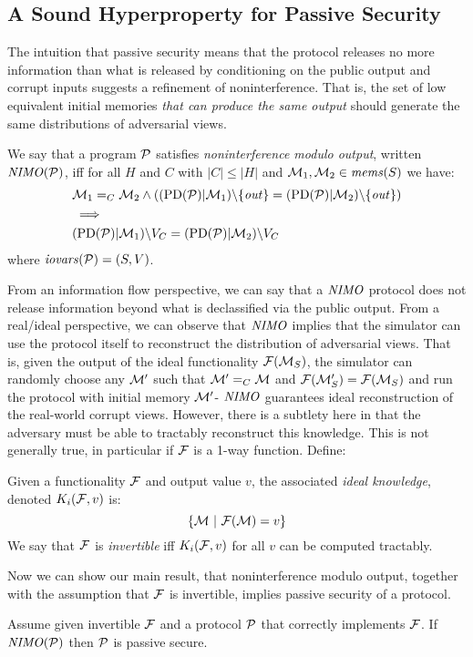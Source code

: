 \subsection{A Sound Hyperproperty for Passive Security}
\label{section-nimo}
The intuition that passive security means that the protocol releases
no more information than what is released by conditioning on the
public output and corrupt inputs suggests a
refinement of noninterference. That is, the set of low equivalent
initial memories \emph{that can produce the same output} should generate the
same distributions of adversarial views.
\begin{definition}
  We say that a program  $\mathcal{P}$ satisfies \emph{noninterference modulo output},
  written $\mathit{NIMO}(\mathcal{P})$, iff for all $H$ and $C$ with $|C|\le|H|$ and 
  $\mathcal{M}_1,\mathcal{M}_2 \in \mathit{mems}(S)$ we have:
  \begin{eqnarray*}
    & \mathcal{M}_1 =_C \mathcal{M}_2 \wedge
     ((\mathrm{PD}(\mathcal{P})|\mathcal{M}_1)\backslash\{ \mathit{out} \} =
     (\mathrm{PD}(\mathcal{P})|\mathcal{M}_2)\backslash\{ \mathit{out} \}) \\
    & \implies \\
    & (\mathrm{PD}(\mathcal{P})|\mathcal{M}_1)\backslash V_C =
    (\mathrm{PD}(\mathcal{P})|\mathcal{M}_2)\backslash V_C
  \end{eqnarray*}
where $\mathit{iovars}(\mathcal{P}) = (S,V)$.
\end{definition}

From an information flow perspective, we can say that a $\mathit{NIMO}$
protocol does not release information beyond what is declassified
via the public output. From a real/ideal perspective, we can
observe that $\mathit{NIMO}$ implies that the simulator can use
the protocol itself to reconstruct the distribution of adversarial
views. That is, given the output of the ideal functionality
$\mathcal{F}(\mathcal{M}_S)$, the simulator can randomly choose any
$\mathcal{M}'$ such that $\mathcal{M}' =_C \mathcal{M}$ and $\mathcal{F}(\mathcal{M}'_S) =
\mathcal{F}(\mathcal{M}_S)$ and run the protocol with initial memory $\mathcal{M}'$-
$\mathit{NIMO}$ guarantees ideal reconstruction of the real-world corrupt views. 
 However, there is a subtlety here in that the adversary
must be able to tractably reconstruct this knowledge. This is not
generally true, in particular if $\mathcal{F}$ is a 1-way
function. Define:
\begin{definition}
  Given a functionality $\mathcal{F}$ and output value $v$, the associated
  \emph{ideal knowledge}, denoted $K_i(\mathcal{F},v)$ is:
  $$
  \{ \mathcal{M}\ |\ \mathcal{F}(\mathcal{M}) = v \}
  $$
  We say that $\mathcal{F}$ is \emph{invertible} iff $K_i(\mathcal{F}, v)$ for all
  $v$ can be computed tractably.
\end{definition}
Now we can show our main result, that noninterference modulo output,
together with the assumption that $\mathcal{F}$ is invertible, implies
passive security of a protocol.
\begin{theorem}
  Assume given invertible $\mathcal{F}$ and a protocol $\mathcal{P}$ that
  correctly implements $\mathcal{F}$.  If $\mathit{NIMO}(\mathcal{P})$
  then $\mathcal{P}$ is passive secure.
\end{theorem}

